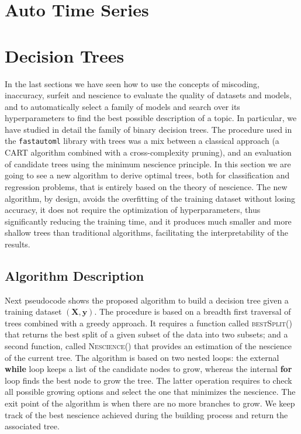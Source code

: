 %
%

\section{Auto Time Series}


%
%

\section{Decision Trees}
\label{sec:decision_trees}

In the last sections we have seen how to use the concepts of miscoding, inaccuracy, surfeit and nescience to evaluate the quality of datasets and models, and to automatically select a family of models and search over its hyperparameters to find the best possible description of a topic. In particular, we have studied in detail the family of binary decision trees. The procedure used in the \texttt{fastautoml} library with trees was a mix between a classical approach (a CART algorithm combined with a cross-complexity pruning), and an evaluation of candidate trees using the minimum nescience principle. In this section we are going to see a new algorithm to derive optimal trees, both for classification and regression problems, that is entirely based on the theory of nescience. The new algorithm, by design, avoids the overfitting of the training dataset without losing accuracy, it does not require the optimization of hyperparameters, thus significantly reducing the training time, and it produces much smaller and more shallow trees than traditional algorithms, facilitating the interpretability of the results.

\subsection{Algorithm Description}
\label{sub:tree_algorithm_description}

Next pseudocode shows the proposed algorithm to build a decision tree given a training dataset $(\mathbf{X}, \mathbf{y})$. The procedure is based on a breadth first traversal of trees combined with a greedy approach. It requires a function called \textsc{bestSplit()} that returns the best split of a given subset of the data into two subsets; and a second function, called \textsc{Nescience()} that provides an estimation of the nescience of the current tree. The algorithm is based on two nested loops: the external \textbf{while} loop keeps a list of the candidate nodes to grow, whereas the internal \textbf{for} loop finds the best node to grow the tree. The latter operation requires to check all possible growing options and select the one that minimizes the nescience. The exit point of the algorithm is when there are no more branches to grow. We keep track of the best nescience achieved during the building process and return the associated tree.


